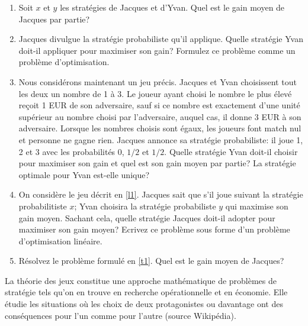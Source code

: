 \begin{enumerate}
    \begin{enumerate}
      \item Soit $x$ et $y$ les strat\'egies de Jacques et d'Yvan. Quel
      est le gain moyen de Jacques par partie? \item Jacques divulgue la
        strat\'egie probabiliste qu'il applique. Quelle strat\'egie Yvan
        doit-il appliquer pour maximiser son gain? Formulez ce probl\`eme
      comme un probl\`eme d'optimisation. \item \label{l1} Nous
        consid\'erons maintenant un jeu pr\'ecis. Jacques et Yvan
        choisissent tout les deux un nombre de  1 \`a 3. Le joueur ayant
        choisi le nombre le plus \'elev\'e re\c coit 1 EUR de son
        adversaire, sauf si ce nombre est exactement d'une unit\'e
        sup\'erieur au nombre choisi par l'adversaire, auquel cas, il donne
        3 EUR \`a son adversaire. Lorsque les nombres choisis sont \'egaux,
        les joueurs font match nul et personne ne gagne rien. Jacques
        annonce sa strat\'egie probabiliste: il joue 1, 2 et 3 avec les
        probabilit\'es $0$, $1/2$ et $1/2$. Quelle strat\'egie Yvan doit-il
        choisir pour maximiser son gain et quel est son gain moyen par
      partie? La strat\'egie optimale pour Yvan est-elle unique? \item
        \label{t1} On consid\`ere le jeu d\'ecrit en \ref{l1}. Jacques sait
        que s'il joue suivant la strat\'egie probabilitiste $x$; Yvan
        choisira la strat\'egie probabiliste $y$ qui maximise son gain
        moyen. Sachant cela, quelle strat\'egie Jacques doit-il adopter pour
        maximiser son gain moyen? Ecrivez ce probl\`eme sous forme d'un
        probl\`eme d'optimisation lin\'eaire.

      \item R\'esolvez le probl\`eme formul\'e en
        \ref{t1}. Quel est le gain moyen de Jacques?

    \end{enumerate}

    \begin{solution}
      La théorie des jeux constitue une approche mathématique de problèmes
      de stratégie tels qu'on en trouve en recherche opérationnelle
      et en économie.
      Elle étudie les situations où les choix de deux protagonistes ou
      davantage ont des conséquences pour
      l'un comme pour l'autre (source Wikipédia).


\end{solution}
\end{enumerate}
